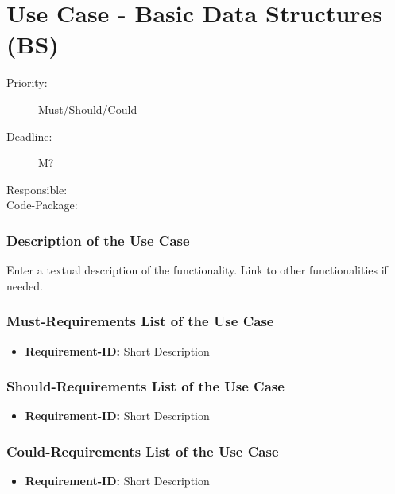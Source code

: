 \section{Use Case - Basic Data Structures (BS)}
\label{UseCase:BS}

\begin{description}
\item[Priority:] Must/Should/Could
\item[Deadline:] M?
\item[Responsible:]
\item[Code-Package:]
\end{description}

\subsubsection*{Description of the Use Case}

Enter a textual description of the functionality. Link to other functionalities if needed. 


\subsubsection*{Must-Requirements List of the Use Case}

\begin{itemize}
\item \textbf{Requirement-ID:} Short Description
\end{itemize}

\subsubsection*{Should-Requirements List of the Use Case}

\begin{itemize}
\item \textbf{Requirement-ID:} Short Description
\end{itemize}

\subsubsection*{Could-Requirements List of the Use Case}

\begin{itemize}
\item \textbf{Requirement-ID:} Short Description
\end{itemize}


